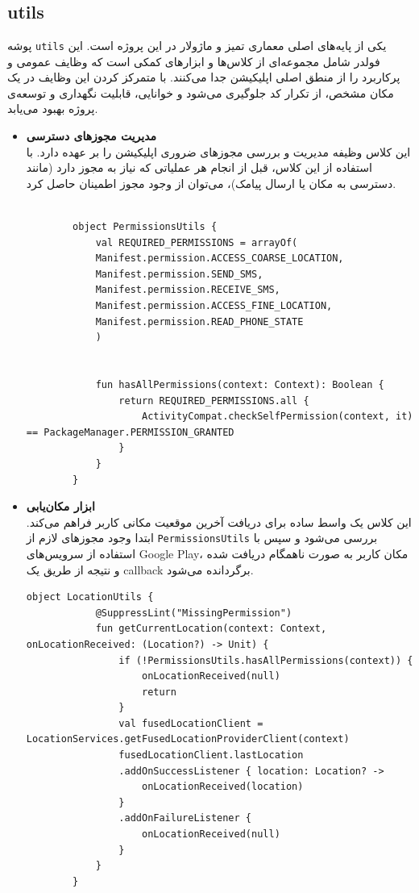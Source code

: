\documentclass{report}
\begin{document}
\section{ }

\subsection{utils}
پوشه \texttt{utils} یکی از پایه‌های اصلی معماری تمیز و ماژولار در این پروژه است. این فولدر شامل مجموعه‌ای از کلاس‌ها و ابزارهای کمکی است که وظایف عمومی و پرکاربرد را از منطق اصلی اپلیکیشن جدا می‌کنند. با متمرکز کردن این وظایف در یک مکان مشخص، از تکرار کد جلوگیری می‌شود و خوانایی، قابلیت نگهداری و توسعه‌ی پروژه بهبود می‌یابد. \\

\begin{itemize}
	\item \textbf{مدیریت مجوزهای دسترسی}\\
	این کلاس وظیفه مدیریت و بررسی مجوزهای ضروری اپلیکیشن را بر عهده دارد. با استفاده از این کلاس، قبل از انجام هر عملیاتی که نیاز به مجوز دارد (مانند دسترسی به مکان یا ارسال پیامک)، می‌توان از وجود مجوز اطمینان حاصل کرد.
	
	\begin{lstlisting}[caption=PermissionsUtils.kt]
		
		object PermissionsUtils {
			val REQUIRED_PERMISSIONS = arrayOf(
			Manifest.permission.ACCESS_COARSE_LOCATION,
			Manifest.permission.SEND_SMS,
			Manifest.permission.RECEIVE_SMS,
			Manifest.permission.ACCESS_FINE_LOCATION,
			Manifest.permission.READ_PHONE_STATE
			)
			
			
			fun hasAllPermissions(context: Context): Boolean {
				return REQUIRED_PERMISSIONS.all {
					ActivityCompat.checkSelfPermission(context, it) == PackageManager.PERMISSION_GRANTED
				}
			}
		}
	\end{lstlisting}
	
	\item \textbf{ابزار مکان‌یابی}\\
	این کلاس یک واسط ساده برای دریافت آخرین موقعیت مکانی کاربر فراهم می‌کند. ابتدا وجود مجوزهای لازم از \texttt{PermissionsUtils} بررسی می‌شود و سپس با استفاده از سرویس‌های Google Play، مکان کاربر به صورت ناهمگام دریافت شده و نتیجه از طریق یک callback برگردانده می‌شود.
	
	\begin{lstlisting}[caption=LocationUtils.kt]
		object LocationUtils {
			@SuppressLint("MissingPermission")
			fun getCurrentLocation(context: Context, onLocationReceived: (Location?) -> Unit) {
				if (!PermissionsUtils.hasAllPermissions(context)) {
					onLocationReceived(null)
					return
				}
				val fusedLocationClient = LocationServices.getFusedLocationProviderClient(context)
				fusedLocationClient.lastLocation
				.addOnSuccessListener { location: Location? ->
					onLocationReceived(location)
				}
				.addOnFailureListener {
					onLocationReceived(null)
				}
			}
		}
	\end{lstlisting}
	

\end{itemize}
\end{document}
